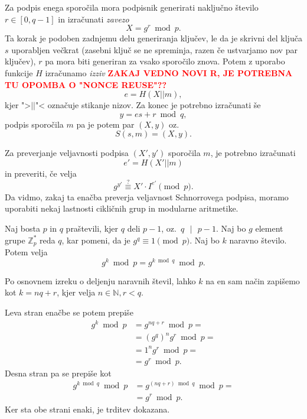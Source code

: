 \documentclass[isrm2, tisk]{fmfdelo}
\newcommand{\N}{\mathbb N}
\newcommand{\Z}{\mathbb Z}
\newcommand{\todo}[1]{\textcolor{red}{\textbf{\uppercase{#1}??}}}
\begin{document}
Za podpis enega sporočila mora podpisnik generirati naključno število $r \in [0, q-1]$ in izračunati 
\textit{zavezo} 
$$ 
X = g^r \bmod p.
$$ 
Ta korak je podoben zadnjemu delu generiranja ključev, le da je skrivni del ključa $s$ uporabljen 
večkrat (zasebni ključ se ne spreminja, razen če ustvarjamo nov par ključev), $r$ pa mora biti 
generiran za vsako sporočilo znova. Potem z uporabo funkcije $H$ izračunamo \textit{izziv} 
\todo{zakaj vedno novi r, je potrebna tu opomba o "nonce reuse"}
$$
e = H(X || m),
$$ 
kjer ">$||$"< označuje stikanje nizov. Za konec je potrebno izračunati še 
$$ 
y = es + r \bmod q, 
$$
podpis sporočila $m$ pa je potem par $(X, y)$ oz.\ 
$$ 
S(s, m) = (X, y).
$$

Za preverjanje veljavnosti podpisa $(X', y')$ sporočila $m$, je potrebno izračunati 
$$ 
e' = H(X' || m)
$$
in preveriti, če velja 
\begin{equation}
    g^{y'} \stackrel{?}{\equiv} X' \cdot I^{e'} \pmod p. \label{eq:schnorr-ver}
\end{equation}
Da vidmo, zakaj ta enačba preverja veljavnost Schnorrovega podpisa, moramo uporabiti nekaj lastnosti
cikličnih grup in modularne aritmetike.
\begin{trditev}
\label{trd:mod-q}
    Naj bosta $p$ in $q$ praštevili, kjer $q$ deli $p - 1$, oz.\ $q \text{ }|\text{ } p - 1$. Naj
    bo $g$ element grupe $\Z_p^*$ reda $q$, kar pomeni, da je $g^q \equiv 1 \pmod p$. Naj bo $k$
    naravno število. Potem velja 
    $$ 
    g^k \bmod p = g^{k \bmod q} \bmod p.
    $$
\end{trditev}
\begin{dokaz}
    Po osnovnem izreku o deljenju naravnih števil, lahko $k$ na en sam način zapišemo kot $k = nq + r$, 
    kjer velja $n \in \N, r < q$.

    Leva stran enačbe se potem prepiše 
    \begin{align*}
        g^k \bmod p &= g^{nq + r} \bmod p = \\ 
                    &= (g^q)^n g^r \bmod p = \\ 
                    &= 1^n g^r \bmod p = \\ 
                    &= g^r \bmod p.
    \end{align*}
    Desna stran pa se prepiše kot 
    \begin{align*}
        g^{k \bmod q} \bmod p &= g^{(nq + r) \bmod q} \bmod p = \\ 
                              &= g^r \bmod p.
    \end{align*}
    Ker sta obe strani enaki, je trditev dokazana.
\end{dokaz}
\end{document}
